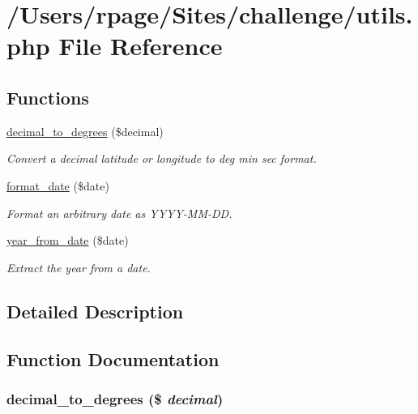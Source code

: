 \hypertarget{utils_8php}{
\section{/Users/rpage/Sites/challenge/utils.php File Reference}
\label{utils_8php}
}
\subsection*{Functions}
\begin{CompactItemize}
\item 
\hyperlink{utils_8php_5a48f0e8551f9316c1a9e8ea2e897aae}{decimal\_\-to\_\-degrees} (\$decimal)
\begin{CompactList}\small\item\em Convert a decimal latitude or longitude to deg min sec format. \item\end{CompactList}\item 
\hyperlink{utils_8php_ac671b7526e88db82a81d2dbc528aff7}{format\_\-date} (\$date)
\begin{CompactList}\small\item\em Format an arbitrary date as YYYY-MM-DD. \item\end{CompactList}\item 
\hyperlink{utils_8php_2553ac15032d0429d0fa3d92ccebf937}{year\_\-from\_\-date} (\$date)
\begin{CompactList}\small\item\em Extract the year from a date. \item\end{CompactList}\end{CompactItemize}


\subsection{Detailed Description}


\subsection{Function Documentation}
\hypertarget{utils_8php_5a48f0e8551f9316c1a9e8ea2e897aae}{
\subsubsection{\setlength{\rightskip}{0pt plus 5cm}decimal\_\-to\_\-degrees (\$ {\em decimal})}}
\label{utils_8php_5a48f0e8551f9316c1a9e8ea2e897aae}


